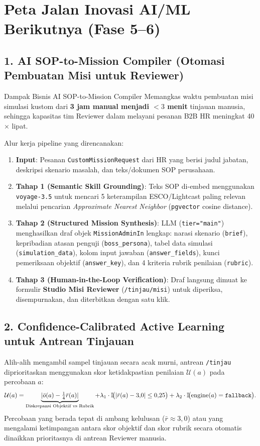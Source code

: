 \documentclass[11pt,a4paper]{report}
\begin{document}
\section{Peta Jalan Inovasi AI/ML Berikutnya (Fase 5--6)}

\subsection{1. AI SOP-to-Mission Compiler (Otomasi Pembuatan Misi untuk Reviewer)}
\begin{execbox}{Dampak Bisnis AI SOP-to-Mission Compiler}
Memangkas waktu pembuatan misi simulasi kustom dari \textbf{3 jam manual menjadi $< 3$ menit} tinjauan manusia, sehingga kapasitas tim Reviewer dalam melayani pesanan B2B HR meningkat 40$\times$ lipat.
\end{execbox}
Alur kerja pipeline yang direncanakan:
\begin{enumerate}[leftmargin=1.5em]
    \item \textbf{Input}: Pesanan \texttt{CustomMissionRequest} dari HR yang berisi judul jabatan, deskripsi skenario masalah, dan teks/dokumen SOP perusahaan.
    \item \textbf{Tahap 1 (Semantic Skill Grounding)}: Teks SOP di-embed menggunakan \texttt{voyage-3.5} untuk mencari 5 keterampilan ESCO/Lightcast paling relevan melalui pencarian \textit{Approximate Nearest Neighbor} (\texttt{pgvector} cosine distance).
    \item \textbf{Tahap 2 (Structured Mission Synthesis)}: LLM (\texttt{tier="main"}) menghasilkan draf objek \texttt{MissionAdminIn} lengkap: narasi skenario (\texttt{brief}), kepribadian atasan penguji (\texttt{boss\_persona}), tabel data simulasi (\texttt{simulation\_data}), kolom input jawaban (\texttt{answer\_fields}), kunci pemeriksaan objektif (\texttt{answer\_key}), dan 4 kriteria rubrik penilaian (\texttt{rubric}).
    \item \textbf{Tahap 3 (Human-in-the-Loop Verification)}: Draf langsung dimuat ke formulir \textbf{Studio Misi Reviewer} (\texttt{/tinjau/misi}) untuk diperiksa, disempurnakan, dan diterbitkan dengan satu klik.
\end{enumerate}

\subsection{2. Confidence-Calibrated Active Learning untuk Antrean Tinjauan}
Alih-alih mengambil sampel tinjauan secara acak murni, antrean \texttt{/tinjau} diprioritaskan menggunakan skor ketidakpastian penilaian $\mathcal{U}(a)$ pada percobaan $a$:
\[
\mathcal{U}(a) = \underbrace{|\bar{o}(a) - \tfrac{1}{4}\bar{r}(a)|}_{\text{Diskrepansi Objektif vs Rubrik}} + \lambda_1 \cdot \mathbb{I}\!\big(|\bar{r}(a) - 3{,}0| \le 0{,}25\big) + \lambda_2 \cdot \mathbb{I}\!\big(\text{engine}(a) = \text{\texttt{fallback}}\big).
\]
Percobaan yang berada tepat di ambang kelulusan ($\bar{r} \approx 3{,}0$) atau yang mengalami ketimpangan antara skor objektif dan skor rubrik secara otomatis dinaikkan prioritasnya di antrean Reviewer manusia.
\end{document}
